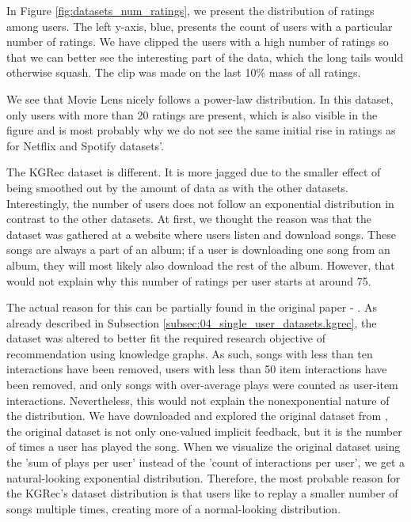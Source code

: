 In Figure \ref{fig:datasets_num_ratings}, we present the distribution of ratings among users. The left y-axis, blue, presents the count of users with a particular number of ratings. We have clipped the users with a high number of ratings so that we can better see the interesting part of the data, which the long tails would otherwise squash. The clip was made on the last 10\% mass of all ratings.

We see that Movie Lens nicely follows a power-law distribution. In this dataset, only users with more than 20 ratings are present, which is also visible in the figure and is most probably why we do not see the same initial rise in ratings as for Netflix and Spotify datasets'.

The KGRec dataset is different. It is more jagged due to the smaller effect of being smoothed out by the amount of data as with the other datasets. Interestingly, the number of users does not follow an exponential distribution in contrast to the other datasets. At first, we thought the reason was that the dataset was gathered at a website where users listen and download songs. These songs are always a part of an album; if a user is downloading one song from an album, they will most likely also download the rest of the album. However, that would not explain why this number of ratings per user starts at around 75.

The actual reason for this can be partially found in the original paper - \cite{kgrec_dataset_origin}. As already described in Subsection \ref{subsec:04_single_user_datasets.kgrec}, the dataset was altered to better fit the required research objective of recommendation using knowledge graphs. As such, songs with less than ten interactions have been removed, users with less than 50 item interactions have been removed, and only songs with over-average plays were counted as user-item interactions. Nevertheless, this would not explain the nonexponential nature of the distribution. We have downloaded and explored the original dataset from \cite{kgrec_dataset_origin_full}, the original dataset is not only one-valued implicit feedback, but it is the number of times a user has played the song. When we visualize the original dataset using the 'sum of plays per user' instead of the 'count of interactions per user', we get a natural-looking exponential distribution. Therefore, the most probable reason for the KGRec's dataset distribution is that users like to replay a smaller number of songs multiple times, creating more of a normal-looking distribution.

